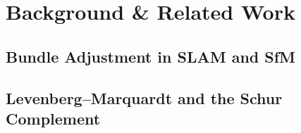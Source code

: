 \section{Background \& Related Work}
\label{sec:related}


\subsection{Bundle Adjustment in SLAM and SfM}
\label{sec:ba_slam}


\subsection{Levenberg--Marquardt and the Schur Complement}
\label{sec:lm_schur}


